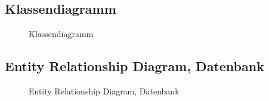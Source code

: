 \documentclass[11pt, a4paper]{article}
\begin{document}
    \subsection{Klassendiagramm}
      \begin{figure}[h!]
        \caption{Klassendiagramm}
        \label{fig:classdiagram}
      \end{figure}
      \newpage

    \subsection{Entity Relationship Diagram, Datenbank}
      \begin{figure}[h!]
        \caption{Entity Relationship Diagram, Datenbank}
        \label{fig:classdiagram}
      \end{figure}
      \newpage
\end{document}
